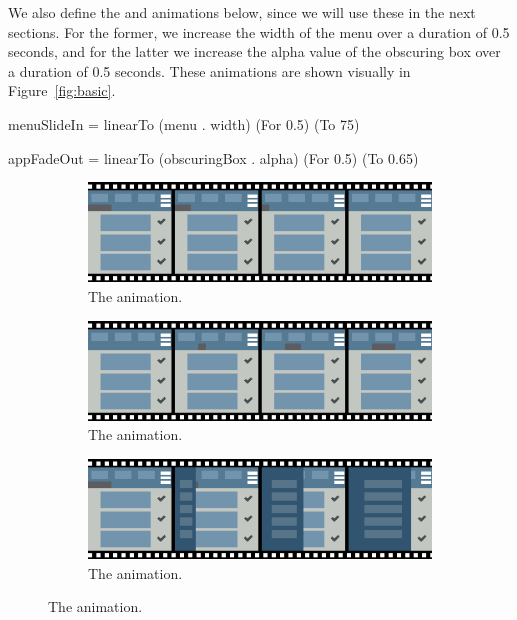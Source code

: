 We also define the  and  animations below, since we will use these in the next sections. For the former, we increase the width of the menu over a duration of 0.5 seconds, and for the latter we increase the alpha value of the obscuring box over a duration of 0.5 seconds. These animations are shown visually in Figure~\ref{fig:basic}.

\begin{spec}
menuSlideIn = linearTo (menu . width) (For 0.5) (To 75)

appFadeOut = linearTo (obscuringBox . alpha) (For 0.5) (To 0.65)
\end{spec}

\begin{figure}[!htbp]
\centering

\begin{subfigure}[h]{\textwidth}
\centering
\includegraphics[width=\figscale\textwidth]{pictures/line1OutroFig}
\caption{The  animation.}
\label{fig:basic1_1}
\end{subfigure}

\begin{subfigure}[h]{\textwidth}
\centering
\includegraphics[width=\figscale\textwidth]{pictures/line2IntroFig}
\caption{The  animation.}
\label{fig:basic1_2}
\end{subfigure}

\begin{subfigure}[h]{\textwidth}
\centering
\includegraphics[width=\figscale\textwidth]{pictures/menuSlideInFig}
\caption{The  animation.}
\label{fig:basic2_1}
\end{subfigure}


\end{figure}

